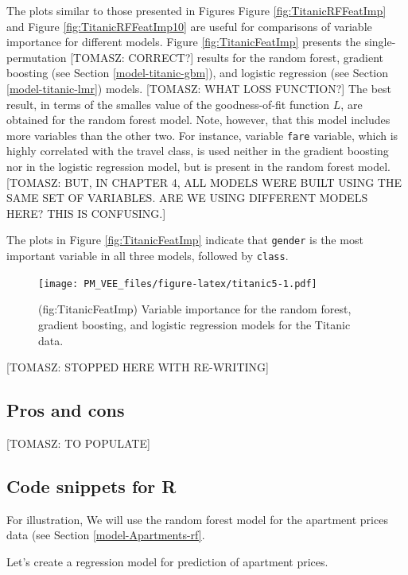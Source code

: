 \documentclass[12pt,]{krantz}
\begin{document}
The plots similar to those presented in Figures Figure \ref{fig:TitanicRFFeatImp} and Figure \ref{fig:TitanicRFFeatImp10} are useful for comparisons of variable importance for different models.
Figure \ref{fig:TitanicFeatImp} presents the single-permutation {[}TOMASZ: CORRECT?{]} results for the random forest, gradient boosting (see Section \ref{model-titanic-gbm}), and logistic regression (see Section \ref{model-titanic-lmr}) models. {[}TOMASZ: WHAT LOSS FUNCTION?{]} The best result, in terms of the smalles value of the goodness-of-fit function \(L\), are obtained for the random forest model. Note, however, that this model includes more variables than the other two. For instance, variable \texttt{fare} variable, which is highly correlated with the travel class, is used neither in the gradient boosting nor in the logistic regression model, but is present in the random forest model. {[}TOMASZ: BUT, IN CHAPTER 4, ALL MODELS WERE BUILT USING THE SAME SET OF VARIABLES. ARE WE USING DIFFERENT MODELS HERE? THIS IS CONFUSING.{]}

The plots in Figure \ref{fig:TitanicFeatImp} indicate that \texttt{gender} is the most important variable in all three models, followed by \texttt{class}.

\begin{figure}
\centering
\texttt{[image: PM\_VEE\_files/figure-latex/titanic5-1.pdf]}
\caption{\label{fig:titanic5}(fig:TitanicFeatImp) Variable importance for the random forest, gradient boosting, and logistic regression models for the Titanic data.}
\end{figure}

{[}TOMASZ: STOPPED HERE WITH RE-WRITING{]}

\hypertarget{featureImportanceProsCons}{%
\subsection{Pros and cons}\label{featureImportanceProsCons}}

{[}TOMASZ: TO POPULATE{]}

\hypertarget{featureImportanceR}{%
\subsection{Code snippets for R}\label{featureImportanceR}}

For illustration, We will use the random forest model for the apartment prices data (see Section \ref{model-Apartments-rf}.

Let's create a regression model for prediction of apartment prices.
\end{document}
